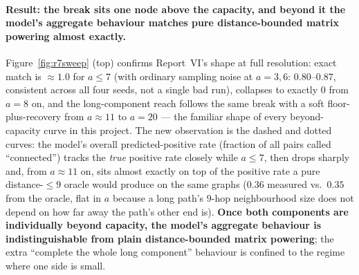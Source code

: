 \documentclass[11pt,a4paper]{article}
\begin{document}
\paragraph{Result: the break sits one node above the capacity, and beyond it the
model's aggregate behaviour matches pure distance-bounded matrix powering almost
exactly.} Figure~\ref{fig:r7sweep} (top) confirms Report~VI's shape at full
resolution: exact match is $\approx1.0$ for $a\le7$ (with ordinary sampling
noise at $a=3,6$: $0.80$--$0.87$, consistent across all four seeds, not a
single bad run), collapses to exactly $0$ from $a=8$ on, and the long-component
reach follows the same break with a soft floor-plus-recovery from $a\approx11$
to $a=20$ --- the familiar shape of every beyond-capacity curve in this project.
The new observation is the dashed and dotted curves: the model's overall
predicted-positive rate (fraction of all pairs called ``connected'') tracks the
\emph{true} positive rate closely while $a\le7$, then drops sharply and, from
$a\approx11$ on, sits almost exactly on top of the positive rate a pure
distance-$\le9$ oracle would produce on the same graphs ($0.36$ measured vs.\
$0.35$ from the oracle, flat in $a$ because a long path's $9$-hop neighbourhood
size does not depend on how far away the path's other end is). \textbf{Once
both components are individually beyond capacity, the model's aggregate
behaviour is indistinguishable from plain distance-bounded matrix powering}; the
extra ``complete the whole long component'' behaviour is confined to the regime
where one side is small.
\end{document}
